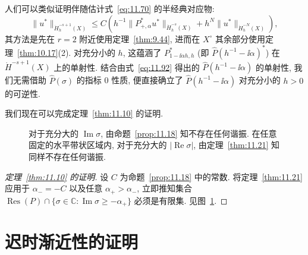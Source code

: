\begin{remark}[伴随算子的高能估计]\label{rem:11.22}
人们可以类似证明伴随估计式~\eqref{eq:11.70} 的半经典对应物:
\begin{equation}\label{eq:11.98}
    \|u^*\|_{\dot H_h^{-s+1}(X)} \le C \left( h^{-1} \|P_{+, \alpha}^* u^*\|_{\dot H_h^{-s}(X)} + h^N \|u^*\|_{\dot H_h^{-N}(X)} \right),
\end{equation}
其方法是先在 $r = 2$ 附近使用定理~\ref{thm:9.44}, 进而在 $X^\circ$ 其余部分使用定理~\ref{thm:10.17}(2). 对充分小的 $h$, 这蕴涵了 $P_{1 - \ii \alpha h, h}^*$ (即 $\widehat{P}(h^{-1} - \ii \alpha)^*$) 在 $\dot H^{-s+1}(X)$ 上的单射性. 结合由式~\eqref{eq:11.92} 得出的 $\widehat{P}(h^{-1} - \ii \alpha)$ 的单射性, 我们无需借助 $\widehat{P}(\sigma)$ 的指标 0 性质, 便直接确立了 $\widehat{P}(h^{-1} - \ii \alpha)$ 对充分小的 $h > 0$ 的可逆性.
\end{remark}

我们现在可以完成定理~\ref{thm:11.10} 的证明.

\begin{figure}[htbp]
\centering
\drawFigElevenFive
\caption{对于充分大的 $\operatorname{Im}\sigma$, 由命题~\ref{prop:11.18} 知不存在任何谐振. 在任意固定的水平带状区域内, 对于充分大的 $|\operatorname{Re}\sigma|$, 由定理~\ref{thm:11.21} 知同样不存在任何谐振.}\label{fig:11.5}
\end{figure}

\begin{proof}[定理~\ref{thm:11.10} 的证明]
设 $C$ 为命题~\ref{prop:11.18} 中的常数. 将定理~\ref{thm:11.21} 应用于 $\alpha_- = -C$ 以及任意 $\alpha_+ > \alpha_-$, 立即推知集合 $\operatorname{Res}(P) \cap \{\sigma \in \mathbb{C} : \operatorname{Im}\sigma \ge -\alpha_+\}$ 必须是有限集. 见图~\ref{fig:11.5}.
\end{proof}

\section{迟时渐近性的证明}\label{sec:11.5}
%
%
%

